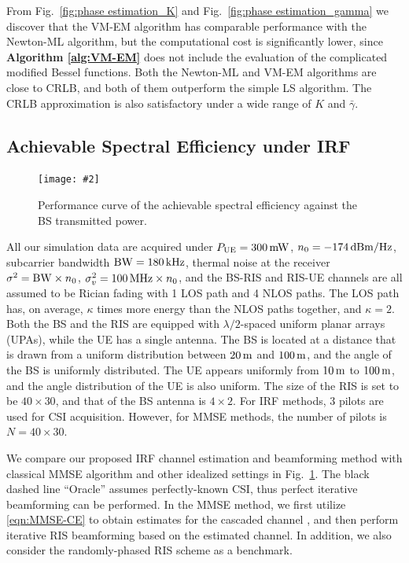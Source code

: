 \documentclass[12pt,draftclsnofoot,journal,onecolumn]{IEEEtran}
\theoremstyle{nonumberplain}
\newcommand{\myincludegraphics}[2][width=12cm]{\texttt{[image: \#2]}}
\begin{document}
    From Fig.~\ref{fig:phase estimation_K} and Fig.~\ref{fig:phase estimation_gamma} we discover that the VM-EM algorithm has comparable performance with the Newton-ML algorithm, but the computational cost is significantly lower, since {\bf Algorithm \ref{alg:VM-EM}} does not include the evaluation of the complicated modified Bessel functions. Both the Newton-ML and VM-EM algorithms are close to CRLB, and both of them outperform the simple LS algorithm. The CRLB approximation is also satisfactory under a wide range of $K$ and $\bar{\gamma}$. 

\subsection{Achievable Spectral Efficiency under IRF} \label{Achievable Spectral Efficiency under IRF}
    \begin{figure}[!t]
        \centering
        \myincludegraphics{data/rate.pdf}
        \caption{Performance curve of the achievable spectral efficiency against the BS transmitted power.}
        \label{fig:rate}
    \end{figure}
    All our simulation data are acquired under $P_{\rm UE}=300 \,{\rm mW}$, $n_0=-174\,{\rm dBm/Hz}$, subcarrier bandwidth ${\rm BW} = 180\,{\rm kHz}$, thermal noise at the receiver $\sigma^2 = {\rm BW}\times n_0$, $\sigma_v^2=100\,{\rm MHz}\times n_0$, and the BS-RIS and RIS-UE channels are all assumed to be Rician fading with 1 LOS path and 4 NLOS paths. The LOS path has, on average, $\kappa$ times more energy than the NLOS paths together, and $\kappa=2$. Both the BS and the RIS are equipped with $\lambda/2$-spaced uniform planar arrays (UPAs), while the UE has a single antenna. The BS is located at a distance that is drawn from a uniform distribution between $20\,{\rm m}$ and $100\,{\rm m}$, and the angle of the BS is uniformly distributed. The UE appears uniformly from $10\,{\rm m}$ to $100\,{\rm m}$, and the angle distribution of the UE is also uniform. The size of the RIS is set to be $40\times 30$, and that of the BS antenna is $4\times 2$. For IRF methods, 3 pilots are used for CSI acquisition. However, for MMSE methods, the number of pilots is $N=40\times 30$. 

    We compare our proposed \ac{IRF} channel estimation and beamforming method with classical MMSE algorithm and other idealized settings in Fig.~\ref{fig:rate}. The black dashed line ``Oracle'' assumes perfectly-known CSI, thus perfect iterative beamforming can be performed. In the MMSE method, we first utilize \eqref{eqn:MMSE-CE} to obtain estimates for the cascaded channel \cite{wei2021channel}, and then perform iterative RIS beamforming based on the estimated channel. In addition, we also consider the randomly-phased RIS scheme as a benchmark.  
\end{document}
